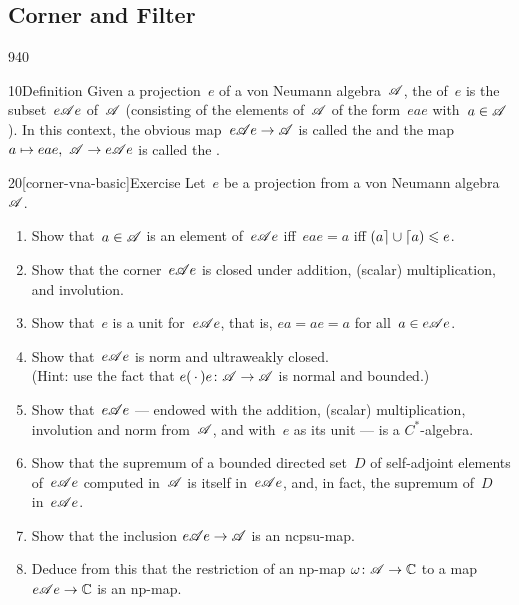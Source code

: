 \subsection{Corner and Filter}
\begin{parsec}{940}%
\begin{point}{10}{Definition}%
Given a projection~$e$ of a von Neumann algebra~$\mathscr{A}$,
the %
of~$e$
is the subset~$e\mathscr{A} e$%
of~$\mathscr{A}$ 
(consisting of the elements of~$\mathscr{A}$
of the form~$eae$ with~$a\in\mathscr{A}$).
In this context,
the obvious map~$e\mathscr{A} e\to\mathscr{A}$
is called the %
and the map $a\mapsto eae,\ \scrA\to e\scrA e$
is called the .%
\end{point}
\begin{point}{20}[corner-vna-basic]{Exercise}%
Let~$e$ be a projection from a von Neumann algebra~$\mathscr{A}$.
\begin{enumerate}
\item
Show that~$a\in\mathscr{A}$ 
is an element of~$e\mathscr{A} e$ iff~$eae=a$
iff $\left(a\right\rceil\cup\left\lceil a\right) \leqslant e$.
\item
Show that the corner~$e\mathscr{A} e$
is closed under addition, (scalar) multiplication,
and involution.
\item
Show that~$e$ is a unit for~$e\mathscr{A} e$,
that is, $ea=ae=a$ for all~$a\in e\mathscr{A} e$.
\item
Show that~$e\mathscr{A} e$ is norm and ultraweakly closed.\\
(Hint: use the fact that $e(\,\cdot\,)e\colon \mathscr{A}\to\mathscr{A}$
is normal and bounded.)
\item
Show that~$e\mathscr{A} e$ --- 
endowed with the addition, (scalar) multiplication,
involution and norm from~$\mathscr{A}$,
and with~$e$ as its unit ---  is a $C^*$-algebra.
\item
Show that the supremum of a bounded directed
set~$D$ of self-adjoint elements of~$e\mathscr{A} e$
computed in~$\mathscr{A}$
is itself in~$e\mathscr{A} e$,
and, in fact, the supremum of~$D$ in~$e\mathscr{A} e$.
\item
Show that the inclusion $e\mathscr{A} e\to\mathscr{A}$
is an ncpsu-map.
\item
Deduce from this that the restriction of an np-map
$\omega\colon \mathscr{A}\to\mathbb{C}$ to
a map $e\mathscr{A} e\to\mathbb{C}$
is an np-map.


\end{enumerate}
\end{point}
\end{parsec}
